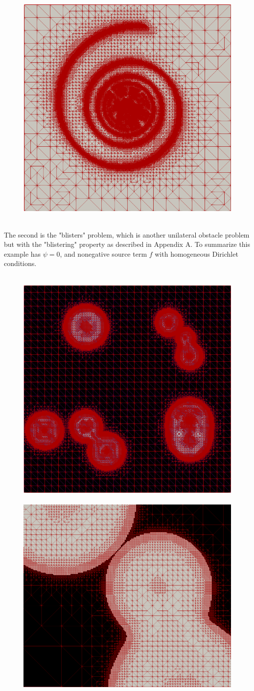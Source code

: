 \documentclass[]{interact}
\theoremstyle{plain}%
\theoremstyle{definition}
\theoremstyle{remark}
\begin{document}
\begin{figure}[ht]
\centering
\mbox{
\includegraphics[width = .75\textwidth]{meshfigs/spiral.png}
}
\caption{}
\label{fig:spiralmeshfig}
\end{figure}




The second is the "blisters" problem, which is another unilateral obstacle problem but with the "blistering" property as described in Appendix A. To summarize this example has $\psi = 0$, and nonegative source term $f$ with homogeneous Dirichlet conditions. 



\begin{figure}[ht]
\centering
\mbox{
\includegraphics[width = .50\textwidth]{meshfigs/blisters.png}\quad\quad
\includegraphics[width = .50\textwidth]{meshfigs/blisterszoomed.png}
}
\caption{}
\label{fig:blistersmeshfig}
\end{figure}
\end{document}
